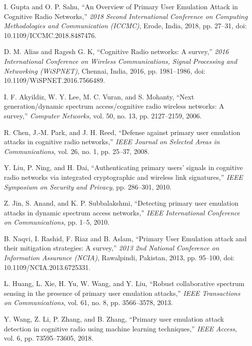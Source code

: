 \documentclass[10pt, oneside, article]{Thesis} %
\begin{document}
\begin{thebibliography}{25}

I. Gupta and O. P. Sahu, ``An Overview of Primary User Emulation Attack in Cognitive Radio Networks,'' \emph{2018 Second International Conference on Computing Methodologies and Communication (ICCMC)}, Erode, India, 2018, pp. 27--31, doi: 10.1109/ICCMC.2018.8487476.

D. M. Alias and Ragesh G. K, ``Cognitive Radio networks: A survey,'' \emph{2016 International Conference on Wireless Communications, Signal Processing and Networking (WiSPNET)}, Chennai, India, 2016, pp. 1981--1986, doi: 10.1109/WiSPNET.2016.7566489.

I. F. Akyildiz, W. Y. Lee, M. C. Vuran, and S. Mohanty, ``Next generation/dynamic spectrum access/cognitive radio wireless networks: A survey,'' \emph{Computer Networks}, vol. 50, no. 13, pp. 2127--2159, 2006.

R. Chen, J.-M. Park, and J. H. Reed, ``Defense against primary user emulation attacks in cognitive radio networks,'' \emph{IEEE Journal on Selected Areas in Communications}, vol. 26, no. 1, pp. 25--37, 2008.

Y. Liu, P. Ning, and H. Dai, ``Authenticating primary users' signals in cognitive radio networks via integrated cryptographic and wireless link signatures,'' \emph{IEEE Symposium on Security and Privacy}, pp. 286--301, 2010.

Z. Jin, S. Anand, and K. P. Subbalakshmi, ``Detecting primary user emulation attacks in dynamic spectrum access networks,'' \emph{IEEE International Conference on Communications}, pp. 1--5, 2010.

B. Naqvi, I. Rashid, F. Riaz and B. Aslam, ``Primary User Emulation attack and their mitigation strategies: A survey,'' \emph{2013 2nd National Conference on Information Assurance (NCIA)}, Rawalpindi, Pakistan, 2013, pp. 95--100, doi: 10.1109/NCIA.2013.6725331.

L. Huang, L. Xie, H. Yu, W. Wang, and Y. Liu, ``Robust collaborative spectrum sensing in the presence of primary user emulation attacks,'' \emph{IEEE Transactions on Communications}, vol. 61, no. 8, pp. 3566--3578, 2013.

Y. Wang, Z. Li, P. Zhang, and B. Zhang, ``Primary user emulation attack detection in cognitive radio using machine learning techniques,'' \emph{IEEE Access}, vol. 6, pp. 73595--73605, 2018.


\end{thebibliography}
\end{document}
